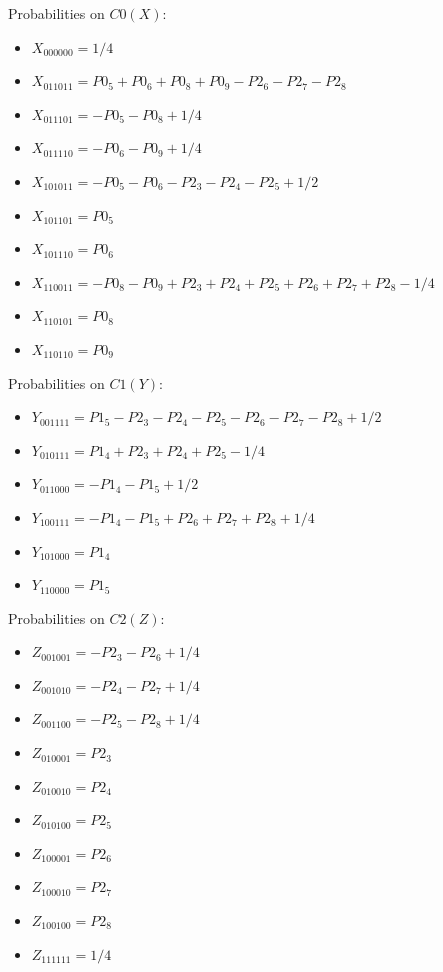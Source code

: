 \documentclass[11pt]{article}
\begin{document}
Probabilities on $C0 (X)$:
\begin{itemize}
    \item $X_{000000} = 1/4$
    \item $X_{011011} = P0_5 + P0_6 + P0_8 + P0_9 - P2_6 - P2_7 - P2_8$
    \item $X_{011101} = -P0_5 - P0_8 + 1/4$
    \item $X_{011110} = -P0_6 - P0_9 + 1/4$
    \item $X_{101011} = -P0_5 - P0_6 - P2_3 - P2_4 - P2_5 + 1/2$
    \item $X_{101101} = P0_5$
    \item $X_{101110} = P0_6$
    \item $X_{110011} = -P0_8 - P0_9 + P2_3 + P2_4 + P2_5 + P2_6 + P2_7 + P2_8 - 1/4$
    \item $X_{110101} = P0_8$
    \item $X_{110110} = P0_9$
\end{itemize}

Probabilities on $C1 (Y)$:
\begin{itemize}
    \item $Y_{001111} = P1_5 - P2_3 - P2_4 - P2_5 - P2_6 - P2_7 - P2_8 + 1/2$
    \item $Y_{010111} = P1_4 + P2_3 + P2_4 + P2_5 - 1/4$
    \item $Y_{011000} = -P1_4 - P1_5 + 1/2$
    \item $Y_{100111} = -P1_4 - P1_5 + P2_6 + P2_7 + P2_8 + 1/4$
    \item $Y_{101000} = P1_4$
    \item $Y_{110000} = P1_5$
\end{itemize}

Probabilities on $C2 (Z)$:
\begin{itemize}
    \item $Z_{001001} = -P2_3 - P2_6 + 1/4$
    \item $Z_{001010} = -P2_4 - P2_7 + 1/4$
    \item $Z_{001100} = -P2_5 - P2_8 + 1/4$
    \item $Z_{010001} = P2_3$
    \item $Z_{010010} = P2_4$
    \item $Z_{010100} = P2_5$
    \item $Z_{100001} = P2_6$
    \item $Z_{100010} = P2_7$
    \item $Z_{100100} = P2_8$
    \item $Z_{111111} = 1/4$
\end{itemize}
\end{document}
